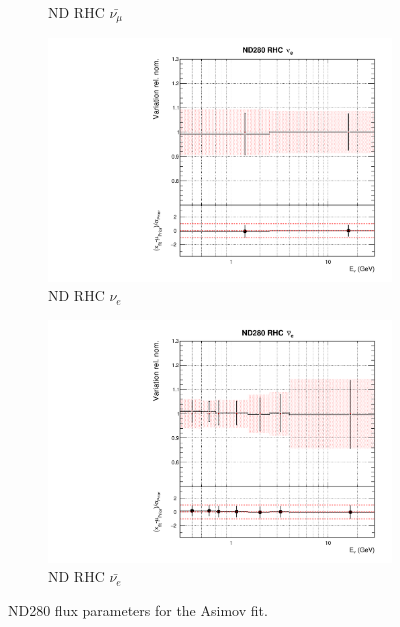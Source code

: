 \begin{figure}
\begin{subfigure}{0.45\textwidth}
  \caption{ND RHC $\bar{\nu_{\mu}}$}
\end{subfigure}
\begin{subfigure}{0.45\textwidth}
  \centering
  \includegraphics[width=0.75\linewidth]{figs/asmvflux6}
  \caption{ND RHC $\nu_{e}$}
\end{subfigure}
\begin{subfigure}{0.45\textwidth}
  \centering
  \includegraphics[width=0.75\linewidth]{figs/asmvflux7}
  \caption{ND RHC $\bar{\nu_e}$}
\end{subfigure}
\caption{ND280 flux parameters for the Asimov fit.}
\label{fig:asmvfluxND}
\end{figure}

